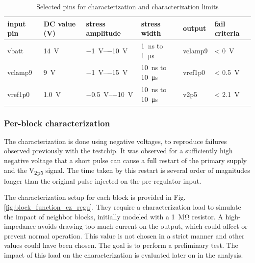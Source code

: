 \begin{table}[!h]
\centering
\begin{tabular}{@{}llll|ll@{}}
\toprule
input pin  & DC value (V)    & stress amplitude           & stress width                                    & output  & fail criteria \\ \midrule
vbatt      & \SI{14}{\volt}  & \SIrange{-1}{-10}{\volt}   & \SI{1}{\nano\second} to \SI{1}{\micro\second}   & vclamp9 & < \SI{0}{\volt}       \\
vclamp9    & \SI{9}{\volt}   & \SIrange{-1}{-15}{\volt}   & \SI{10}{\nano\second} to \SI{10}{\micro\second} & vref1p0 & < \SI{0.5}{\volt}         \\
vref1p0    & \SI{1.0}{\volt} & \SIrange{-0.5}{-10}{\volt} & \SI{10}{\nano\second} to \SI{10}{\micro\second} & v2p5    & < \SI{2.1}{\volt}      \\
\bottomrule
\end{tabular}
\caption{Selected pins for characterization and characterization limits}
\label{selected-pins-for-cz}
\end{table}

\subsubsection{Per-block characterization}

The characterization is done using negative voltages, to reproduce failures observed previously with the testchip.
It was observed for a sufficiently high negative voltage that a short pulse can cause a full restart of the primary supply and the V\textsubscript{2p5} signal.
The time taken by this restart is several order of magnitudes longer than the original pulse injected on the pre-regulator input.

The characterization setup for each block is provided in Fig. \ref{fig:block_function_cz_regu}.
They require a characterization load to simulate the impact of neighbor blocks, initially modeled with a \SI{1}{\mega\ohm} resistor.
A high-impedance avoids drawing too much current on the output, which could affect or prevent normal operation.
This value is not chosen in a strict manner and other values could have been chosen.
The goal is to perform a preliminary test.
The impact of this load on the characterization is evaluated later on in the analysis.

